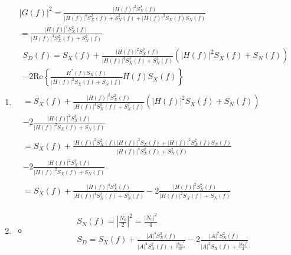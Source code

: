 \documentclass[a4paper, twoside, fleqn]{scrartcl}
\newcommand{\abs}[1]{\ensuremath{\left| #1 \right|}} %
\newcommand{\re}[1]{\ensuremath{\text{Re}\left\{ #1 \right\}}} %
\begin{document}
\begin{enumerate}
    \item
      \label{2c}
      \begin{gather}
        \abs{G(f)}^2 = \frac{ \abs{H(f)}^2 S_X^2(f) }{ \abs{H(f)}^4 S_X^2(f) + S_N^2(f) + \abs{H(f)}^2 S_X(f) S_N(f) } \\
        = \frac{ \abs{H(f)}^2 S_X^2(f) }{ \abs{H(f)}^4 S_X^2(f) + S_N^2(f)} \\
        \begin{split}
	  S_D(f) = S_X(f) + \frac{ \abs{H(f)}^2 S_X^2(f) }{ \abs{H(f)}^4 S_X^2(f) + S_N^2(f)} ( \abs{H(f)}^2 S_X(f) + S_N(f) ) \\
	  - 2 \re{ \frac{ H^*(f) S_X(f) }{ \abs{H(f)}^2 S_X(f) + S_N(f) } H(f) S_X(f) }
	\end{split} \\
	\begin{split}
	  = S_X(f) + \frac{ \abs{H(f)}^2 S_X^2(f) }{ \abs{H(f)}^4 S_X^2(f) + S_N^2(f)} ( \abs{H(f)}^2 S_X(f) + S_N(f) ) \\
	  - 2 \frac{ \abs{H(f)}^2 S_X^2(f) }{ \abs{H(f)}^2 S_X(f) + S_N(f) }
	\end{split} \\
	\begin{split}
	  = S_X(f) + \frac{ \abs{H(f)}^2 S_X^2(f) \abs{H(f)}^2 S_X(f) + \abs{H(f)}^2 S_X^2(f) S_N(f) }{ \abs{H(f)}^4 S_X^2(f) + S_N^2(f)}  \\
	  - 2 \frac{ \abs{H(f)}^2 S_X^2(f) }{ \abs{H(f)}^2 S_X(f) + S_N(f) }
	\end{split} \\
	\begin{split}
	  = S_X(f) + \frac{ \abs{H(f)}^4 S_X^3(f) }{ \abs{H(f)}^4 S_X^2(f) + S_N^2(f)} %
	  - 2 \frac{ \abs{H(f)}^2 S_X^2(f) }{ \abs{H(f)}^2 S_X(f) + S_N(f) }
	\end{split}
      \end{gather}
      
    \item
      \label{2d}
      \begin{itemize}
        \item 
	  \begin{gather}
	    S_N(f) = \abs{\frac{N_0} 2}^2 = \frac{ \abs{N_0}^2} 4 \\
	    S_D= S_X(f) + \frac{ \abs{A}^4 S_X^3(f) }{ \abs{A}^4 S_X^2(f) + \frac{ \abs{N_0}^4} {16} } - 2 \frac{ \abs{A}^2 S_X^2(f) }{ \abs{A}^2 S_X(f) + \frac{ \abs{N_0}^2} 4 }
	  \end{gather}
	

\end{itemize}
\end{enumerate}
\end{document}
